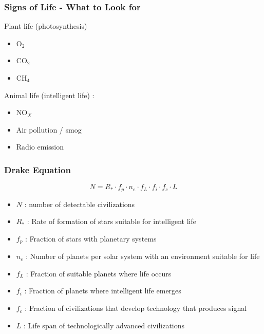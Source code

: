\documentclass{beamer}
\begin{document}
\begin{frame}
\frametitle{Signs of Life - What to Look for}
Plant life (photosynthesis)
\begin{itemize}
    \item $\text{O}_{2}$
    \pause
    \item $\text{CO}_{2}$
    \pause
    \item $\text{CH}_{4}$
    \pause
\end{itemize}

Animal life (intelligent life) : 
\begin{itemize}
    \item $\text{NO}_{X}$
    \pause
    \item Air pollution / smog
    \pause
    \item Radio emission
\end{itemize}
\end{frame}


\begin{frame}
\frametitle{Drake Equation}
$$ N = R_{*} \cdot f_{p} \cdot n_{e} \cdot f_{L} \cdot f_{i} \cdot f_{c} \cdot L$$
\begin{itemize}
    \item $N$ : number of detectable civilizations 
    \item $R_{*}$ : Rate of formation of stars suitable for intelligent life
    \item $f_{p}$ : Fraction of stars with planetary systems
    \item $n_{e}$ : Number of planets per solar system with an environment suitable for life
    \item $f_{L}$ : Fraction of suitable planets where life occurs
    \item $f_{i}$ : Fraction of planets where intelligent life emerges
    \item $f_{c}$ : Fraction of civilizations that develop technology that produces signal
    \item $L$     : Life span of technologically advanced civilizations
\end{itemize}
\end{frame}
\end{document}
